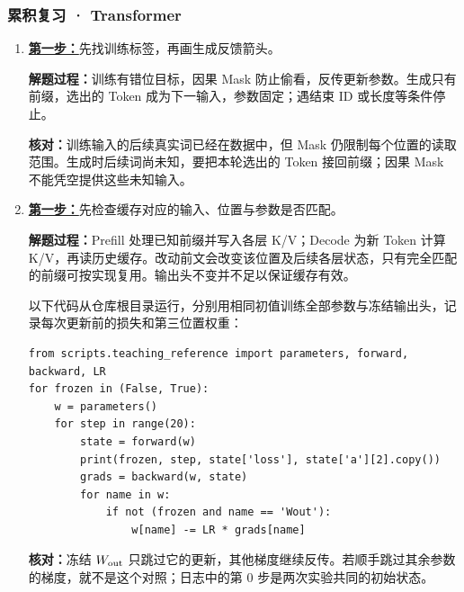 \subsubsection*{累积复习 · Transformer}
\begin{enumerate}[label={},leftmargin=4.8em,itemsep=4pt]
\item[\textbf{R-09.}] \leavevmode{}\label{solution:R-09}\label{solution:review-training-generation}\hyperref[exercise:review-training-generation]{\textbf{第一步：}}先找训练标签，再画生成反馈箭头。\par\nobreak\textbf{解题过程：}训练有错位目标，因果 Mask 防止偷看，反传更新参数。生成只有前缀，选出的 Token 成为下一输入，参数固定；遇结束 ID 或长度等条件停止。\par\textbf{核对：}训练输入的后续真实词已经在数据中，但 Mask 仍限制每个位置的读取范围。生成时后续词尚未知，要把本轮选出的 Token 接回前缀；因果 Mask 不能凭空提供这些未知输入。
\item[\textbf{R-10.}] \leavevmode{}\label{solution:R-10}\label{solution:review-cache-output-head}\hyperref[exercise:review-cache-output-head]{\textbf{第一步：}}先检查缓存对应的输入、位置与参数是否匹配。\par\nobreak
\textbf{解题过程：}Prefill 处理已知前缀并写入各层 K/V；Decode 为新 Token 计算 K/V，再读历史缓存。改动前文会改变该位置及后续各层状态，只有完全匹配的前缀可按实现复用。输出头不变并不足以保证缓存有效。\par{}以下代码从仓库根目录运行，分别用相同初值训练全部参数与冻结输出头，记录每次更新前的损失和第三位置权重：\par\nobreak
\begin{samepage}\begin{verbatim}
from scripts.teaching_reference import parameters, forward, backward, LR
for frozen in (False, True):
    w = parameters()
    for step in range(20):
        state = forward(w)
        print(frozen, step, state['loss'], state['a'][2].copy())
        grads = backward(w, state)
        for name in w:
            if not (frozen and name == 'Wout'):
                w[name] -= LR * grads[name]
\end{verbatim}\end{samepage}
\textbf{核对：}冻结 $W_{\rm out}$ 只跳过它的更新，其他梯度继续反传。若顺手跳过其余参数的梯度，就不是这个对照；日志中的第 $0$ 步是两次实验共同的初始状态。
\end{enumerate}
